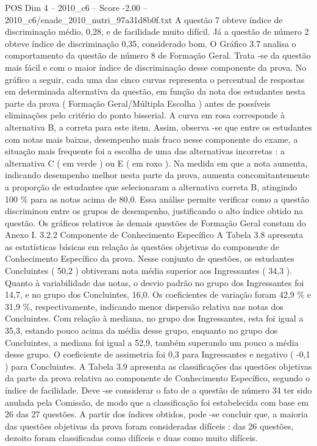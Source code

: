 \begin{textsample}{POS Dim 4 – 2010\_c6 – Score -2.00 – 2010\_c6/enade\_2010\_nutri\_97a31d8b0f.txt}
A questão 7 obteve índice de discriminação médio, 0,28, e de facilidade muito difícil.
Já a questão de número 2 obteve índice de discriminação 0,35, considerado bom.
O Gráfico 3.7 analisa o comportamento da questão de número 8 de Formação Geral.
Trata -se da questão mais fácil e com o maior índice de discriminação desse componente da prova.
No gráfico a seguir, cada uma das cinco curvas representa o percentual de respostas em determinada alternativa da questão, em função da nota dos estudantes nesta parte da prova ( Formação Geral/Múltipla Escolha ) antes de possíveis eliminações pelo critério do ponto bisserial.
A curva em rosa corresponde à alternativa B, a correta para este item.
Assim, observa -se que entre os estudantes com notas mais baixas, desempenho mais fraco nesse componente do exame, a situação mais frequente foi a escolha de uma das alternativas incorretas : a alternativa C ( em verde ) ou E ( em roxo ).
Na medida em que a nota aumenta, indicando desempenho melhor nesta parte da prova, aumenta concomitantemente a proporção de estudantes que selecionaram a alternativa correta B, atingindo 100 \% para as notas acima de 80,0.
Essa análise permite verificar como a questão discriminou entre os grupos de desempenho, justificando o alto índice obtido na questão.
Os gráficos relativos às demais questões de Formação Geral constam do Anexo I. 3.2.2 Componente de Conhecimento Específico A Tabela 3.8 apresenta as estatísticas básicas em relação às questões objetivas do componente de Conhecimento Específico da prova.
Nesse conjunto de questões, os estudantes Concluintes ( 50,2 ) obtiveram nota média superior aos Ingressantes ( 34,3 ).
Quanto à variabilidade das notas, o desvio padrão no grupo dos Ingressantes foi 14,7, e no grupo dos Concluintes, 16,0.
Os coeficientes de variação foram 42,9 \% e 31,9 \%, respectivamente, indicando menor dispersão relativa nas notas dos Concluintes.
Com relação à mediana, no grupo dos Ingressantes, esta foi igual a 35,3, estando pouco acima da média desse grupo, enquanto no grupo dos Concluintes, a mediana foi igual a 52,9, também superando um pouco a média desse grupo.
O coeficiente de assimetria foi 0,3 para Ingressantes e negativo ( -0,1 ) para Concluintes.
A Tabela 3.9 apresenta as classificações das questões objetivas da parte da prova relativa ao componente de Conhecimento Específico, segundo o índice de facilidade.
Deve -se considerar o fato de a questão de número 34 ter sido anulada pela Comissão, de modo que a classificação foi estabelecida com base em 26 das 27 questões.
A partir dos índices obtidos, pode -se concluir que, a maioria das questões objetivas da prova foram consideradas difíceis : das 26 questões, dezoito foram classificadas como difíceis e duas como muito difíceis.

\end{textsample}
